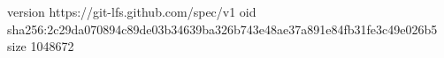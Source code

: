 version https://git-lfs.github.com/spec/v1
oid sha256:2c29da070894c89de03b34639ba326b743e48ae37a891e84fb31fe3c49e026b5
size 1048672
